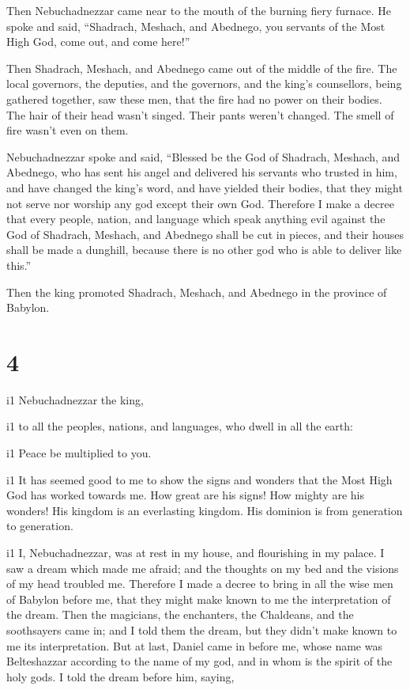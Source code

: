  Then Nebuchadnezzar came near to the mouth of the burning
fiery furnace. He spoke and said, ``Shadrach, Meshach, and Abednego, you
servants of the Most High God, come out, and come here!''

Then Shadrach, Meshach, and Abednego came out of the middle of the fire.
 The local governors, the deputies, and the governors, and
the king's counsellors, being gathered together, saw these men, that the
fire had no power on their bodies. The hair of their head wasn't singed.
Their pants weren't changed. The smell of fire wasn't even on them.

 Nebuchadnezzar spoke and said, ``Blessed be the God of
Shadrach, Meshach, and Abednego, who has sent his angel and delivered
his servants who trusted in him, and have changed the king's word, and
have yielded their bodies, that they might not serve nor worship any god
except their own God.  Therefore I make a decree that every
people, nation, and language which speak anything evil against the God
of Shadrach, Meshach, and Abednego shall be cut in pieces, and their
houses shall be made a dunghill, because there is no other god who is
able to deliver like this.''

 Then the king promoted Shadrach, Meshach, and Abednego in
the province of Babylon.

\hypertarget{section-3}{%
\section{4}\label{section-3}}

i1 Nebuchadnezzar the king,

i1 to all the peoples, nations, and languages, who dwell in all the
earth:

i1 Peace be multiplied to you.

i1 It has seemed good to me to show the signs and wonders
that the Most High God has worked towards me.  How great are
his signs! How mighty are his wonders! His kingdom is an everlasting
kingdom. His dominion is from generation to generation.

i1 I, Nebuchadnezzar, was at rest in my house, and
flourishing in my palace.  I saw a dream which made me
afraid; and the thoughts on my bed and the visions of my head troubled
me.  Therefore I made a decree to bring in all the wise men
of Babylon before me, that they might make known to me the
interpretation of the dream.  Then the magicians, the
enchanters, the Chaldeans, and the soothsayers came in; and I told them
the dream, but they didn't make known to me its interpretation.
 But at last, Daniel came in before me, whose name was
Belteshazzar according to the name of my god, and in whom is the spirit
of the holy gods. I told the dream before him, saying,

